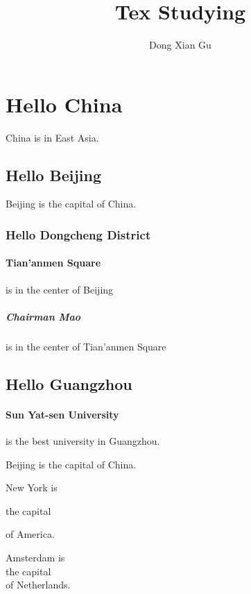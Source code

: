 \documentclass[12pt]{article}
\author{Dong Xian Gu}
\title{Tex Studying}
\begin{document}
\maketitle %
\tableofcontents
\section{Hello China} China is in East Asia.
\subsection{Hello Beijing} Beijing is the capital of China.
\subsubsection{Hello Dongcheng District}
\paragraph{Tian'anmen Square}is in the center of Beijing
\subparagraph{Chairman Mao} is in the center of Tian'anmen Square
\subsection{Hello Guangzhou}
\paragraph{Sun Yat-sen University} is the best university in Guangzhou.

Beijing is
the capital
of China.

New York is

the capital

of America.

Amsterdam is \\ the capital \\
of Netherlands.
\end{document}
